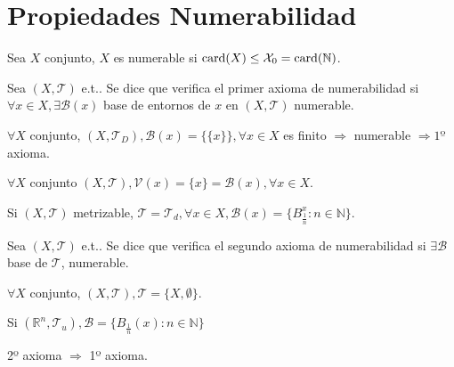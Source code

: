 \chapter{Propiedades Numerabilidad}

\begin{defn}[Numerable]
  Sea $X$ conjunto, $X$ es numerable si $\operatorname{card}(X) \leq \mathcal{X}_{0} = \operatorname{card}(\mathbb{N})$.
\end{defn}

\begin{defn}
  Sea $( X, \mathcal{T} )$ e.t.. Se dice que verifica el primer axioma de numerabilidad si $\forall x \in X, \exists \mathcal{B}(x)$ base de entornos de $x$ en $( X, \mathcal{T} )$ numerable.
\end{defn}

\begin{ejm}
  $\forall X$ conjunto, $( X, \mathcal{T}_{D} ), \mathcal{B} (x) = \{ \{ x \} \}, \forall x \in X$ es finito $\Rightarrow$ numerable $\Rightarrow 1º $ axioma.
\end{ejm}

\begin{ejm}
  $\forall X $ conjunto $( X, \mathcal{T} ), \mathcal{V}(x) = \{ x \} = \mathcal{B} (x), \forall x \in X$.
\end{ejm}

\begin{ejm}
  Si $( X, \mathcal{T} )$ metrizable, $\mathcal{T} = \mathcal{T}_{d}, \forall x \in X, \mathcal{B} (x) = \{  B_{\frac{1}{n}}^x : n \in \mathbb{N} \}$.
\end{ejm}

\begin{defn}
  Sea $( X, \mathcal{T} )$ e.t.. Se dice que verifica el segundo axioma de numerabilidad si $ \exists \mathcal{B}$ base de $\mathcal{T}$, numerable.
\end{defn}

\begin{ejm}
  $\forall X$ conjunto, $( X, \mathcal{T} ), \mathcal{T} = \{  X, \emptyset \}$.
\end{ejm}

\begin{ejm}
  Si $( \mathbb{R}^{n}, \mathcal{T}_{u} ), \mathcal{B} = \{ B_{\frac{1}{n}}(x) : n \in \mathbb{N} \}$
\end{ejm}

\begin{obs}
  2º axioma $\Rightarrow$ 1º axioma.
\end{obs}


